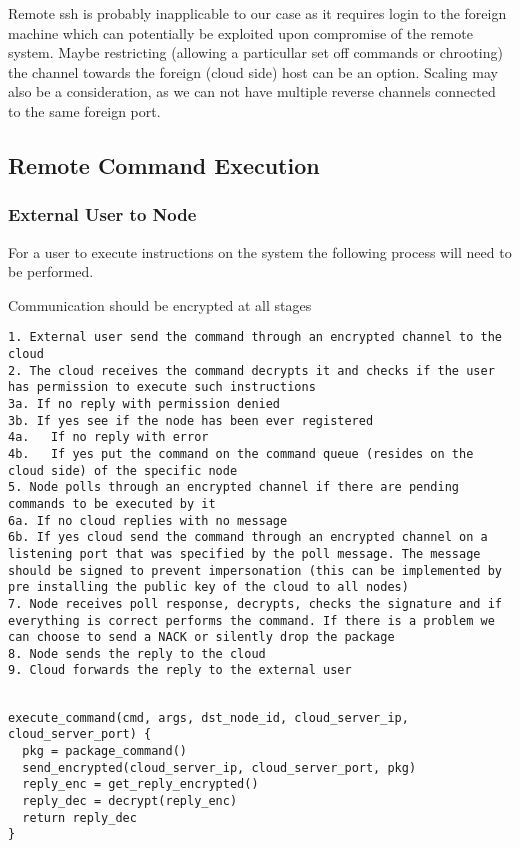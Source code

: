 Remote ssh is probably inapplicable to our case as it requires login to the foreign machine which can potentially be exploited upon compromise of the remote system. Maybe restricting (allowing a particullar set off commands or chrooting) the channel towards the foreign (cloud side) host can be an option. Scaling may also be a consideration, as we can not have multiple reverse channels connected to the same foreign port.

\subsection{Remote Command Execution}

\subsubsection{External User to Node}

For a user to execute instructions on the system the following process will need to be performed.

Communication should be encrypted at all stages
\begin{lstlisting}[frame=single]
1. External user send the command through an encrypted channel to the cloud
2. The cloud receives the command decrypts it and checks if the user has permission to execute such instructions
3a. If no reply with permission denied
3b. If yes see if the node has been ever registered
4a.   If no reply with error
4b.   If yes put the command on the command queue (resides on the cloud side) of the specific node 
5. Node polls through an encrypted channel if there are pending commands to be executed by it
6a. If no cloud replies with no message
6b. If yes cloud send the command through an encrypted channel on a listening port that was specified by the poll message. The message should be signed to prevent impersonation (this can be implemented by pre installing the public key of the cloud to all nodes)
7. Node receives poll response, decrypts, checks the signature and if everything is correct performs the command. If there is a problem we can choose to send a NACK or silently drop the package
8. Node sends the reply to the cloud
9. Cloud forwards the reply to the external user
\end{lstlisting}


\begin{lstlisting}[frame=single,caption=External user]

execute_command(cmd, args, dst_node_id, cloud_server_ip, cloud_server_port) {
  pkg = package_command()
  send_encrypted(cloud_server_ip, cloud_server_port, pkg)
  reply_enc = get_reply_encrypted()
  reply_dec = decrypt(reply_enc)
  return reply_dec
}
\end{lstlisting}


